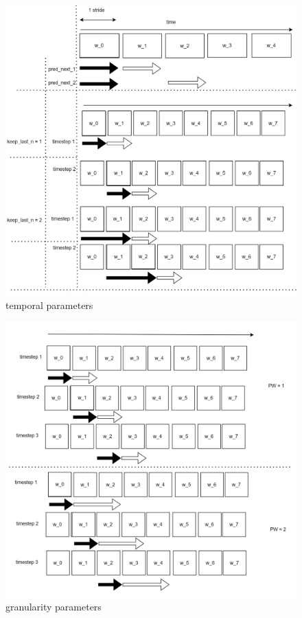 \documentclass{IEEEtran}
\begin{document}
\begin{figure}[htbp]
\centering
\includegraphics[width=.9\linewidth]{./images/screenshot_20220321_130701.png}
\caption{\label{temporal_parameters}temporal parameters}
\end{figure}

\begin{figure}[htbp]
\centering
\includegraphics[width=.9\linewidth]{./images/screenshot_20220321_130720.png}
\caption{\label{granularity_parameters}granularity parameters}
\end{figure}
\end{document}
